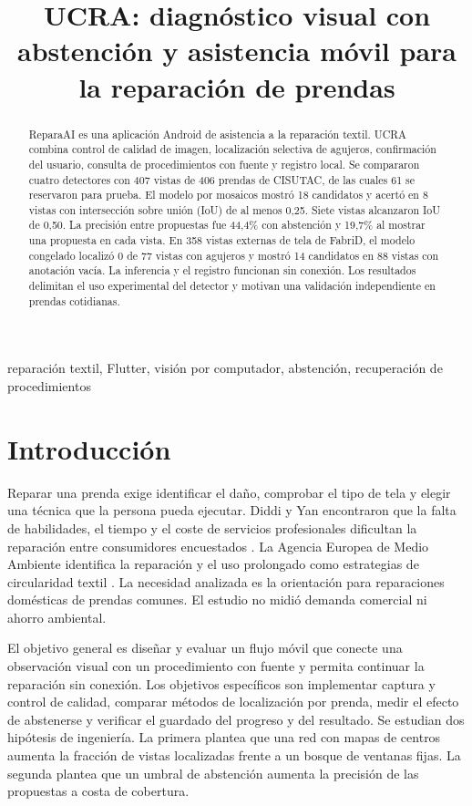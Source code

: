 \documentclass[conference,a4paper]{IEEEtran}
\title{UCRA: diagnóstico visual con abstención y asistencia móvil para la reparación de prendas}
\author{\IEEEauthorblockN{Lopez Arela, Ower Frank}
\and \IEEEauthorblockN{Zegarra Puma, Mauricio Eduardo}
\and \IEEEauthorblockN{Huamani Chañi, Diego Oswaldo}}
\begin{document}
\maketitle
\begin{abstract}
ReparaAI es una aplicación Android de asistencia a la reparación textil. UCRA combina control de calidad de imagen, localización selectiva de agujeros, confirmación del usuario, consulta de procedimientos con fuente y registro local. Se compararon cuatro detectores con 407 vistas de 406 prendas de CISUTAC, de las cuales 61 se reservaron para prueba. El modelo por mosaicos mostró 18 candidatos y acertó en 8 vistas con intersección sobre unión (IoU) de al menos 0,25. Siete vistas alcanzaron IoU de 0,50. La precisión entre propuestas fue 44,4\% con abstención y 19,7\% al mostrar una propuesta en cada vista. En 358 vistas externas de tela de FabriD, el modelo congelado localizó 0 de 77 vistas con agujeros y mostró 14 candidatos en 88 vistas con anotación vacía. La inferencia y el registro funcionan sin conexión. Los resultados delimitan el uso experimental del detector y motivan una validación independiente en prendas cotidianas.
\end{abstract}
\begin{IEEEkeywords}
reparación textil, Flutter, visión por computador, abstención, recuperación de procedimientos
\end{IEEEkeywords}

\section{Introducción}

Reparar una prenda exige identificar el daño, comprobar el tipo de tela y elegir una técnica que la persona pueda ejecutar. Diddi y Yan encontraron que la falta de habilidades, el tiempo y el coste de servicios profesionales dificultan la reparación entre consumidores encuestados \cite{diddi2019}. La Agencia Europea de Medio Ambiente identifica la reparación y el uso prolongado como estrategias de circularidad textil \cite{eea}. La necesidad analizada es la orientación para reparaciones domésticas de prendas comunes. El estudio no midió demanda comercial ni ahorro ambiental.

El objetivo general es diseñar y evaluar un flujo móvil que conecte una observación visual con un procedimiento con fuente y permita continuar la reparación sin conexión. Los objetivos específicos son implementar captura y control de calidad, comparar métodos de localización por prenda, medir el efecto de abstenerse y verificar el guardado del progreso y del resultado. Se estudian dos hipótesis de ingeniería. La primera plantea que una red con mapas de centros aumenta la fracción de vistas localizadas frente a un bosque de ventanas fijas. La segunda plantea que un umbral de abstención aumenta la precisión de las propuestas a costa de cobertura.
\end{document}
